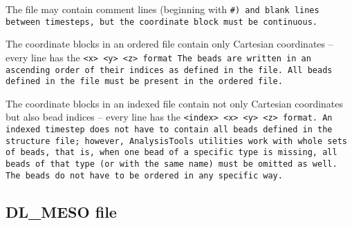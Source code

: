 The \vcf file may contain comment lines (beginning with
\tt{\#}) and blank lines between timesteps, but the coordinate block
must be continuous.

The coordinate blocks in an ordered \vcf file contain only Cartesian
coordinates -- every line has the \tt{<x> <y> <z>} format The beads are
written in an ascending order of their indices as defined in the \vsf file.
All beads defined in the \vsf file must be present in the ordered \vcf
file.

The coordinate blocks in an indexed \vcf file contain not only Cartesian
coordinates but also bead indices -- every line has the \tt{<index> <x> <y>
<z>} format. An indexed timestep does not have to contain all beads defined
in the \vsf structure file; however, \tt{AnalysisTools} utilities work with
whole sets of beads, that is, when one bead of a specific type is missing,
all beads of that type (or with the same name) must be omitted as well.
The beads do not have to be ordered in any specific way. %

\subsection{DL\_MESO \field file} %

